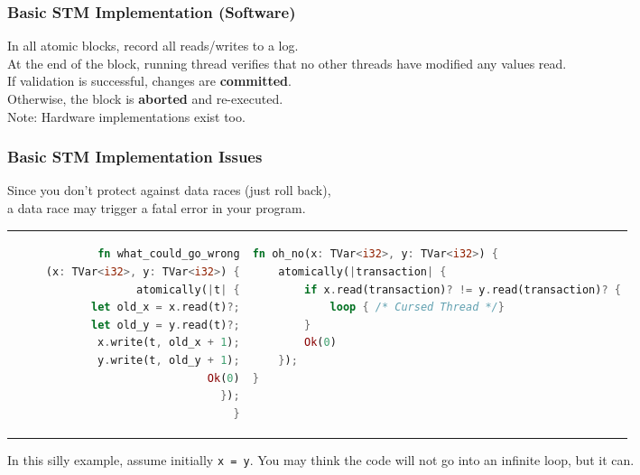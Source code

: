 \begin{frame}
  \frametitle{Basic STM Implementation (Software)}


    In all atomic blocks, record all reads/writes to a log.\\[1em]
    At the end of the block, running thread verifies that no other threads
      have modified any values read.\\[1em]
    If validation is successful, changes are {\bf committed}.\\
    Otherwise, the block is {\bf aborted} and re-executed.\\[2em]

  Note: Hardware implementations exist too.



\end{frame}

\begin{frame}[fragile]
  \frametitle{Basic STM Implementation Issues}


    Since you don't protect against data races (just roll back),\\
      a data race may trigger a fatal error in your program.

\begin{tabular}{r|l}
\begin{minipage}{.46\textwidth}
\begin{lstlisting}[language=Rust]
fn what_could_go_wrong
     (x: TVar<i32>, y: TVar<i32>) {
    atomically(|t| {
        let old_x = x.read(t)?;
        let old_y = y.read(t)?;
        x.write(t, old_x + 1);
        y.write(t, old_y + 1);
        Ok(0)
    });
}
\end{lstlisting}
\end{minipage}
&
\begin{minipage}{.52\textwidth}
\begin{lstlisting}[language=Rust]
fn oh_no(x: TVar<i32>, y: TVar<i32>) {
    atomically(|transaction| {
        if x.read(transaction)? != y.read(transaction)? {
            loop { /* Cursed Thread */}
        }
        Ok(0)
    });
}
\end{lstlisting}
\end{minipage}
\end{tabular}

 In this silly example, assume initially {\tt x = y}. You may think the
      code will not go into an infinite loop, but it can.

\end{frame}


